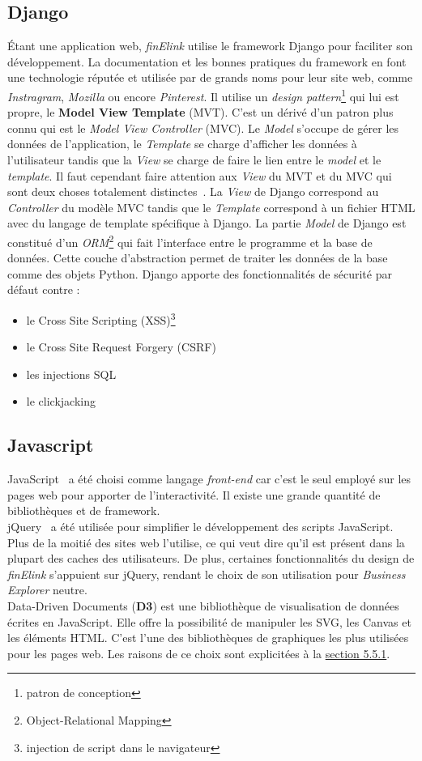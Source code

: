 \subsection{Django}
Étant une application web, \textit{finElink} utilise le framework Django pour faciliter son développement. La documentation et les bonnes pratiques du framework en font une technologie réputée et utilisée par de grands noms pour leur site web, comme \textit{Instragram}, \textit{Mozilla} ou encore \textit{Pinterest}. Il utilise un \textit{design pattern}\footnote{patron de conception} qui lui est propre, le \textbf{Model View Template} (MVT). C'est un dérivé d'un patron plus connu qui est le \textit{Model View Controller} (MVC). Le \textit{Model} s'occupe de gérer les données de l'application, le \textit{Template} se charge d'afficher les données à l'utilisateur tandis que la \textit{View} se charge de faire le lien entre le \textit{model} et le \textit{template}. Il faut cependant faire attention aux \textit{View} du MVT et du MVC qui sont deux choses totalement distinctes~\cite{mvt}. La \textit{View} de Django correspond au \textit{Controller} du modèle MVC tandis que le \textit{Template} correspond à un fichier HTML avec du langage de template spécifique à Django. La partie \textit{Model} de Django est constitué d'un \textit{ORM}\footnote{Object-Relational Mapping} qui fait l'interface entre le programme et la base de données. Cette couche d'abstraction permet de traiter les données de la base comme des objets Python. Django apporte des fonctionnalités de sécurité par défaut contre :
\begin{itemize}
\item le Cross Site Scripting (XSS)\footnote{injection de script dans le navigateur}
\item le Cross Site Request Forgery (CSRF)
\item les injections SQL
\item le clickjacking
\end{itemize}

\subsection{Javascript}
JavaScript~\cite{js} a été choisi comme langage \textit{front-end} car c'est le seul employé sur les pages web pour apporter de l'interactivité. Il existe une grande quantité de bibliothèques et de framework.\\

jQuery~\cite{jQuery} a été utilisée pour simplifier le développement des scripts JavaScript. Plus de la moitié des sites web l'utilise, ce qui veut dire qu'il est présent dans la plupart des caches des utilisateurs. De plus, certaines fonctionnalités du design de \textit{finElink} s'appuient sur jQuery, rendant le choix de son utilisation pour \textit{Business Explorer} neutre.\\

Data-Driven Documents (\textbf{D3}) est une bibliothèque de visualisation de données écrites en JavaScript. Elle offre la possibilité de manipuler les SVG, les Canvas et les éléments HTML. C'est l'une des bibliothèques de graphiques les plus utilisées pour les pages web. Les raisons de ce choix sont explicitées à la \hyperref[comp_bibliotheques]{section 5.5.1}.